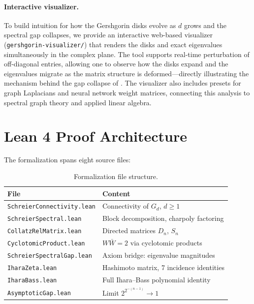 \documentclass[12pt]{article}
\begin{document}
\paragraph{Interactive visualizer.}
To build intuition for how the Gershgorin disks evolve as $d$ grows
and the spectral gap collapses, we provide an interactive web-based
visualizer (\texttt{gershgorin-visualizer/}) that renders the disks
and exact eigenvalues simultaneously in the complex plane.  The tool
supports real-time perturbation of off-diagonal entries, allowing one
to observe how the disks expand and the eigenvalues migrate as the
matrix structure is deformed---directly illustrating the mechanism
behind the gap collapse of .  The visualizer also
includes presets for graph Laplacians and neural network weight
matrices, connecting this analysis to spectral graph theory and
applied linear algebra.

\section{Lean 4 Proof Architecture}
\label{sec:lean}

The formalization spans eight source files:

\begin{table}[h!]
  \centering
  \begin{tabular}{l l}
    \hline
    File & Content \\
    \hline
    \texttt{SchreierConnectivity.lean} & Connectivity of $G_d$, $d \ge 1$ \\
    \texttt{SchreierSpectral.lean} & Block decomposition, charpoly factoring \\
    \texttt{CollatzRelMatrix.lean} & Directed matrices $D_n$, $S_n$ \\
    \texttt{CyclotomicProduct.lean} & $W\bar{W} = 2$ via cyclotomic products \\
    \texttt{SchreierSpectralGap.lean} & Axiom bridge: eigenvalue magnitudes \\
    \texttt{IharaZeta.lean} & Hashimoto matrix, 7 incidence identities \\
    \texttt{IharaBass.lean} & Full Ihara--Bass polynomial identity \\
    \texttt{AsymptoticGap.lean} & Limit $2^{2^{-(n-1)}} \to 1$ \\
    \hline
  \end{tabular}
  \caption{Formalization file structure.}
\end{table}
\end{document}

